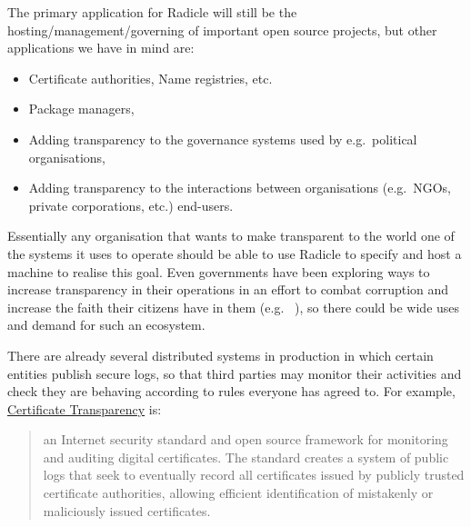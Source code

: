 \documentclass[a4paper, oneside, 10pt]{amsart}
\newcommand*\eg{e.g.\ }
\begin{document}
The primary application for Radicle will still be the
hosting/management/governing of important open source projects, but other
applications we have in mind are:

\begin{itemize}
\item
  Certificate authorities, Name registries, etc.
\item
  Package managers,
\item
  Adding transparency to the governance systems used by e.g.~political
  organisations,
\item
  Adding transparency to the interactions between organisations
  (e.g.~NGOs, private corporations, etc.) end-users.
\end{itemize}

Essentially any organisation that wants to make transparent to the world one of
the systems it uses to operate should be able to use Radicle to specify and host
a machine to realise this goal. Even governments have been exploring ways to
increase transparency in their operations in an effort to combat corruption and
increase the faith their citizens have in them (\eg
\cite{ukraine-transparency}), so there could be wide uses and demand for such an
ecosystem.

There are already several distributed systems in production in which
certain entities publish secure logs, so that third parties may monitor
their activities and check they are behaving according to rules everyone
has agreed to. For example,
\href{https://en.wikipedia.org/wiki/Certificate_Transparency}{Certificate
Transparency} is:
\begin{quote}
an Internet security standard and open source framework for monitoring
and auditing digital certificates. The standard creates a system of
public logs that seek to eventually record all certificates issued by
publicly trusted certificate authorities, allowing efficient
identification of mistakenly or maliciously issued certificates.
\end{quote}
\end{document}
